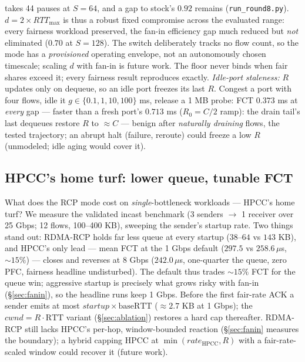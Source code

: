 \documentclass[sigconf, nonacm]{acmart}
\newcommand{\hpccfs}{\textsc{RDMA-RCP}\xspace}
\begin{document}
takes 44 pauses at $S{=}64$, and a gap to stock's $0.92$ remains
(\texttt{run\_round8.py}). $d = 2 \times RTT_{\max}$ is thus a robust fixed compromise
across the evaluated range: every fairness workload preserved, the fan-in efficiency gap much
reduced but \emph{not} eliminated ($0.70$ at $S{=}128$). The switch deliberately tracks no
flow count, so the mode has a \emph{provisioned} operating envelope, not an autonomously
chosen timescale; scaling $d$ with fan-in is future work.
The floor never binds when fair shares exceed it; every fairness result reproduces exactly.
\emph{Idle-port staleness:} $R$ updates only on dequeue, so an idle port freezes its last
$R$. Congest a port with four flows, idle it $g \in \{0.1, 1, 10, 100\}$ ms, release a 1 MB
probe: FCT $0.373$ ms at \emph{every} gap --- faster than a fresh port's $0.713$ ms
($R_0{=}C/2$ ramp): the drain tail's last dequeues restore $R$ to ${\approx}C$ --- benign
after \emph{naturally draining} flows, the tested trajectory; an abrupt halt (failure,
reroute) could freeze a low $R$ (unmodeled; idle aging would cover it).

\subsection{HPCC's home turf: lower queue, tunable FCT}
\label{sec:cost}

What does the RCP mode cost on \emph{single}-bottleneck workloads --- HPCC's home turf? We
measure the validated incast benchmark (3 senders $\to$ 1 receiver over 25 Gbps; 12 flows,
100--400 KB), sweeping the sender's startup rate. Two things stand out: \hpccfs holds far less queue at every
startup ($38$--$64$ vs $143$ KB), and HPCC's only lead --- mean FCT at the 1 Gbps default
($297.5$ vs $258.6\,\mu$s, ${\sim}15\%$) --- closes and reverses at 8 Gbps
($242.0\,\mu$s, one-quarter the queue, zero PFC, fairness headline undisturbed). The
default thus trades ${\sim}15\%$ FCT for the queue win; aggressive startup is precisely
what grows risky with fan-in (\S\ref{sec:fanin}), so the headline runs keep 1 Gbps. Before the first fair-rate ACK a sender
emits at most $\mathit{startup} \times \mathrm{baseRTT}$ (${\approx}2.7$ KB at 1 Gbps);
the $cwnd = R \cdot \mathrm{RTT}$ variant (\S\ref{sec:ablation}) restores a hard cap
thereafter. \hpccfs still lacks HPCC's per-hop,
window-bounded reaction (\S\ref{sec:fanin} measures the boundary); a hybrid capping HPCC at
$\min(\mathit{rate}_{\mathrm{HPCC}}, R)$ with a fair-rate-scaled window could recover it
(future work).
\end{document}
